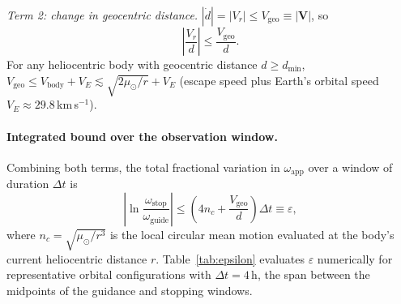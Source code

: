 \documentclass[11pt,a4paper]{article}
\begin{document}
\textit{Term 2: change in geocentric distance.}
$|\dot{d}| = |V_r| \le V_\mathrm{geo} \equiv |\mathbf{V}|$, so
\begin{equation}
  \left|\frac{V_r}{d}\right| \le \frac{V_\mathrm{geo}}{d}.
\end{equation}
For any heliocentric body with geocentric distance $d \ge d_\mathrm{min}$,
$V_\mathrm{geo} \le V_\mathrm{body} + V_E \lesssim \sqrt{2\mu_\odot/r} + V_E$
(escape speed plus Earth's orbital speed $V_E \approx 29.8$\,km\,s$^{-1}$).

\paragraph{Integrated bound over the observation window.}
Combining both terms, the total fractional variation in $\omega_\mathrm{app}$
over a window of duration $\Delta t$ is
\begin{equation}
  \left|\ln\frac{\omega_\mathrm{stop}}{\omega_\mathrm{guide}}\right|
  \le \left(4n_c + \frac{V_\mathrm{geo}}{d}\right)\Delta t
  \equiv \varepsilon,
  \label{eq:epsilon_bound}
\end{equation}
where $n_c = \sqrt{\mu_\odot/r^3}$ is the local circular mean motion evaluated
at the body's current heliocentric distance $r$.
Table~\ref{tab:epsilon} evaluates $\varepsilon$ numerically for representative
orbital configurations with $\Delta t = 4\,\mathrm{h}$, the span between the
midpoints of the guidance and stopping windows.
\end{document}
